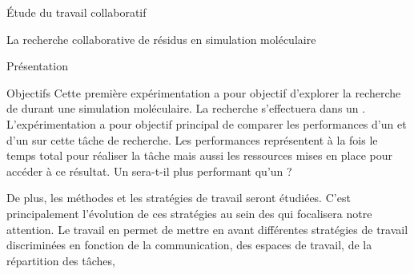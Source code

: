\documentclass[myfrancais]{mythesis}
\begin{document}
\begin{mypart}{Étude du travail collaboratif}
\begin{mychapter}{La recherche collaborative de résidus en simulation moléculaire}
\begin{mysection}{Présentation}
\begin{mysubsection}{Objectifs}
					Cette première expérimentation a pour objectif d'explorer la recherche de  durant une simulation moléculaire.
					La recherche s'effectuera dans un .
					L'expérimentation a pour objectif principal de comparer les performances d'un  et d'un  sur cette tâche de recherche.
					Les performances représentent à la fois le temps total pour réaliser la tâche mais aussi les ressources mises en place pour accéder à ce résultat.
					Un  sera-t-il plus performant qu'un  ?

					De plus, les méthodes et les stratégies de travail seront étudiées.
					C'est principalement l'évolution de ces stratégies au sein des  qui focalisera notre attention.
					Le travail en  permet de mettre en avant différentes stratégies de travail discriminées en fonction de la communication, des espaces de travail, de la répartition des tâches, \myetc


\end{mysubsection}
\end{mysection}
\end{mychapter}
\end{mypart}
\end{document}
